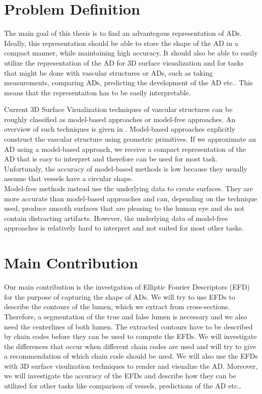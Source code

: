 \documentclass[thesis.tex]{subfiles}
\begin{document}
\section{Problem Definition} \label{problem_def}
The main goal of this thesis is to find an advantegous representation of ADs. Ideally, this representation should be able to store the shape of the AD in a compact manner, while maintaining high accuracy. It should also be able to easily utilize the representation of the AD for 3D surface visualization and for tasks that might be done with vascular structures or ADs, such as taking measurements, comparing ADs, predicting the development of the AD etc.. This means that the representaiton has to be easily interpretable.

Current 3D Surface Visualization techniques of vascular structures can be roughly classified as model-based approaches or model-free approaches. An overview of such techniques is given in \cite{preim20083d}. Model-based approaches explicitly construct the vascular structure using geometric primitives. If we approximate an AD using a model-based approach, we receive a compact representation of the AD that is easy to interpret and therefore can be used for most task. Unfortunaly, the accuracy of model-based methods is low because they usually assume that vessels have a circular shape. \\ Model-free methods instead use the underlying data to create surfaces. They are more accurate than model-based approaches and can, depending on the technique used, produce smooth surfaces that are pleasing to the human eye and do not contain distracting artifacts. However, the underlying data of model-free approaches is relatively hard to interpret and not suited for most other tasks. 

\section{Main Contribution}
Our main contribution is the investgation of Elliptic Fourier Descriptors (EFD) for the purpose of capturing the shape of ADs. We will try to use EFDs to describe the contours of the lumen, which we extract from cross-sections. Therefore, a segmentation of the true and false lumen is necessary and we also need the centerlines of both lumen. The extracted contours have to be described by chain codes before they can be used to compute the EFDs. We will investigate the differences that occur when different chain codes are used and will try to give a recommendation of which chain code should be used. We will also use the EFDs with 3D surface visulization techniques to render and visualize the AD. Moreover, we will investigate the accuracy of the EFDs and describe how they can be utilized for other tasks like comparison of vessels, predictions of the AD etc..
\end{document}
